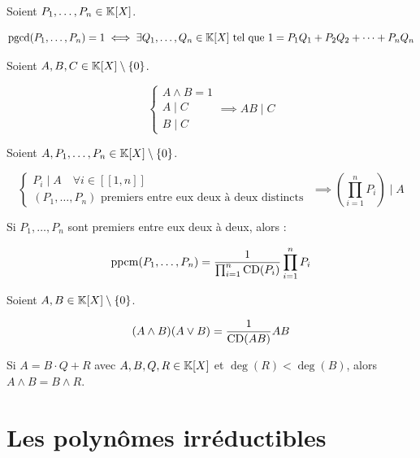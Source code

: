 \documentclass[12pt, a4paper]{report}
\begin{document}
\begin{consequence}
    Soient $P_1,\dots,P_n \in \mathbb{K}[X]$.

    $$\mathrm{pgcd}(P_1,\dots,P_n) = 1 \iff \exists Q_1, \dots, Q_n \in \mathbb{K}[X] \text{ tel que } 1 = P_1Q_1 + P_2Q_2 + \cdots + P_nQ_n$$
\end{consequence}

\begin{theorem}
    Soient $A,B,C \in \mathbb{K}[X]\setminus\{0\}$.

    $$\begin{cases}
    A \wedge B = 1\\
    A \mid C\\
    B \mid C
    \end{cases}
    \implies AB \mid C$$
\end{theorem}

\begin{consequence}
    Soient $A, P_1, \dots, P_n \in \mathbb{K}[X]\setminus\{0\}$.

    $$\begin{cases}
    P_i \mid A \quad \forall i \in [\![1,n]\!]\\
    (P_1,\dots,P_n) \text{ premiers entre eux deux à deux distincts }
    \end{cases}
    \implies \left(\prod_{i=1}^{n} P_i\right) \mid A$$
\end{consequence}

\begin{property}
    Si $P_1, \dots, P_n$ sont premiers entre eux deux à deux, alors :

    $$\mathrm{ppcm}(P_1,\dots,P_n) = \frac{1}{\prod_{i=1}^{n} \mathrm{CD}(P_i)} \prod_{i=1}^{n} P_i$$
\end{property}

\begin{consequence}
    Soient $A,B \in \mathbb{K}[X]\setminus\{0\}$.

    $$(A\wedge B)(A \vee B) = \frac{1}{\mathrm{CD}(AB)} AB$$
\end{consequence}

\begin{theorem}
    Si $A = B\cdot Q + R$ avec $A,B,Q,R \in \mathbb{K}[X]$ et $\deg(R) < \deg(B)$, alors $A\wedge B = B\wedge R$.
\end{theorem}

\section{Les polynômes irréductibles}
\end{document}
